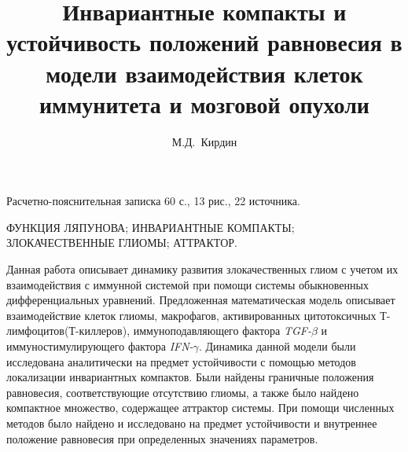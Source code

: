 \documentclass[14pt,a4paper]{extarticle}
\title{Инвариантные компакты и устойчивость положений равновесия в модели взаимодействия клеток иммунитета и мозговой опухоли}
\author{М.Д.~Кирдин}
\begin{document}
	\maketitle
	
	\begin{annotation}
	
	Расчетно-пояснительная записка 60 с., 13 рис., 22  источника.
	
	\MakeUppercase{функция Ляпунова; инвариантные компакты; злокачественные глиомы; аттрактор.}
	
	Данная работа описывает динамику развития злокачественных глиом с учетом их взаимодействия с иммунной системой при помощи системы обыкновенных дифференциальных уравнений. Предложенная математическая модель описывает взаимодействие клеток глиомы, макрофагов, активированных цитотоксичных Т-лимфоцитов(Т-киллеров), иммуноподавляющего фактора \textit{TGF-}$\beta$ и иммуностимулирующего фактора \textit{IFN-}$\gamma$. Динамика данной модели были исследована аналитически на предмет устойчивости с помощью методов локализации инвариантных компактов. Были найдены граничные положения равновесия, соответствующие отсутствию глиомы, а также было найдено компактное множество, содержащее аттрактор системы. При помощи численных методов было найдено и исследовано на предмет устойчивости и внутреннее положение равновесия при определенных значениях параметров.
	
	\end{annotation}
	
	\tableofcontents
	
\end{document}
